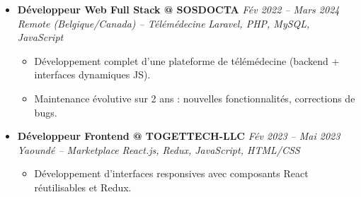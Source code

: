 \documentclass[a4paper,11pt]{article}
\begin{document}
\begin{itemize}[leftmargin=*, label={-}]
\item \textbf{Développeur Web Full Stack @ SOSDOCTA} \hfill \textit{Fév 2022 -- Mars 2024} \\
\textit{Remote (Belgique/Canada) -- Télémédecine} \hfill \textit{Laravel, PHP, MySQL, JavaScript}
\vspace{-2pt}
    \begin{itemize}[leftmargin=0.4cm, nosep, label=\tiny$\bullet$]
        \item \small{Développement complet d'une plateforme de télémédecine (backend + interfaces dynamiques JS).}
        \item \small{Maintenance évolutive sur 2 ans : nouvelles fonctionnalités, corrections de bugs.}
    \end{itemize}
\vspace{3pt}

\item \textbf{Développeur Frontend @ TOGETTECH-LLC} \hfill \textit{Fév 2023 -- Mai 2023} \\
\textit{Yaoundé -- Marketplace} \hfill \textit{React.js, Redux, JavaScript, HTML/CSS}
\vspace{-2pt}
    \begin{itemize}[leftmargin=0.4cm, nosep, label=\tiny$\bullet$]
        \item \small{Développement d'interfaces responsives avec composants React réutilisables et Redux.}
    \end{itemize}
\vspace{3pt}

\end{itemize}

\end{document}
